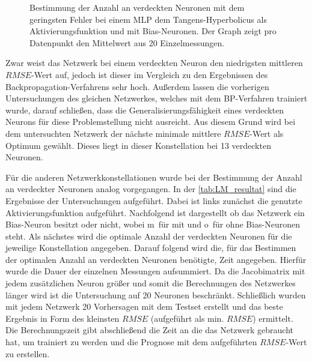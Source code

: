 \begin{figure}[!htb]
    \centering
        
    \caption[Beispiel zur Bestimmung der Anzahl verdeckter Neuronen beim LM]{Bestimmung der Anzahl an verdeckten Neuronen mit dem geringsten Fehler bei einem MLP dem Tangens-Hyperbolicus als Aktivierungsfunktion und mit Bias-Neuronen. Der Graph zeigt pro Datenpunkt den Mittelwert aus 20 Einzelmessungen.}
    \label{fig:LM_tanh_m-hneuron}
\end{figure}

Zwar weist das Netzwerk bei einem verdeckten Neuron den niedrigsten mittleren $RMSE$-Wert auf, jedoch ist dieser im Vergleich zu den Ergebnissen des Backpropagation-Verfahrens sehr hoch. Außerdem lassen die vorherigen Untersuchungen des gleichen Netzwerkes, welches mit dem BP-Verfahren trainiert wurde, darauf schließen, dass die Generalisierungsfähigkeit eines verdeckten Neurons für diese Problemstellung nicht ausreicht. Aus diesem Grund wird bei dem untersuchten Netzwerk der nächste minimale mittlere $RMSE$-Wert als Optimum gewählt. Dieses liegt in dieser Konstellation bei 13 verdeckten Neuronen. 

Für die anderen Netzwerkkonstellationen wurde bei der Bestimmung der Anzahl an verdeckter Neuronen analog vorgegangen. In der \autoref{tab:LM_resultat} sind die Ergebnisse der Untersuchungen aufgeführt. Dabei ist links zunächst die genutzte Aktivierungsfunktion aufgeführt. Nachfolgend ist dargestellt ob das Netzwerk ein Bias-Neuron besitzt oder nicht, wobei \glqq m\grqq~für mit und \glqq o\grqq~für ohne Bias-Neuronen steht. Als nächstes wird die optimale Anzahl der verdeckten Neuronen für die jeweilige Konstellation angegeben. Darauf folgend wird die, für das Bestimmen der optimalen Anzahl an verdeckten Neuronen benötigte, Zeit angegeben. Hierfür wurde die Dauer der einzelnen Messungen aufsummiert. Da die Jacobimatrix mit jedem zusätzlichen Neuron größer und somit die Berechnungen des Netzwerkes länger wird ist die Untersuchung auf 20 Neuronen beschränkt. Schließlich wurden mit jedem Netzwerk 20 Vorhersagen mit dem Testset erstellt und das beste Ergebnis in Form des kleinsten $RMSE$ (aufgeführt als min. $RMSE$) ermittelt. Die Berechnungszeit gibt abschließend die Zeit an die das Netzwerk gebraucht hat, um trainiert zu werden und die Prognose mit dem aufgeführten $RMSE$-Wert zu erstellen.

